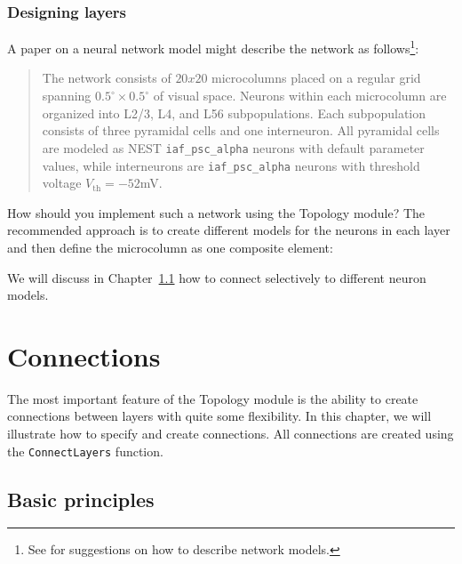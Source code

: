 \documentclass[a4paper,12pt]{report}
\begin{document}
\subsection{Designing layers}\label{sec:layerdesign}

A paper on a neural network model might describe the network as
follows\footnote{See \citet{Nord:2009(456)} for suggestions on how to
  describe network models.}:
\begin{quote}
The network consists of $20x20$ microcolumns placed on a regular grid
spanning $0.5^\circ\times 0.5^\circ$ of visual space. Neurons within each
microcolumn are organized into L2/3, L4, and L56
subpopulations. Each subpopulation consists of three pyramidal cells
and one interneuron. All pyramidal cells are modeled as NEST
\lstinline!iaf_psc_alpha! neurons with default parameter values, while
interneurons are \lstinline!iaf_psc_alpha! neurons with threshold voltage
$V_{\text{th}}=-52$mV. 
\end{quote}
How should you implement such a network using the Topology module?
The recommended approach is to create different models for the
neurons in each layer and then define the microcolumn as one
composite element:
%

%
We will discuss in Chapter~\ref{sec:conn_basics} how to connect
selectively to different neuron models.


\chapter{Connections}\label{sec:connections}

The most important feature of the Topology module is the ability to
create connections between layers with quite some
flexibility. In this chapter, we will illustrate how to specify and
create connections. All connections are created using the
\lstinline!ConnectLayers! function.


\section{Basic principles}\label{sec:conn_basics}
\end{document}
